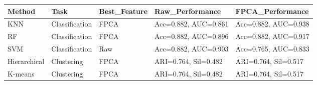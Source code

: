 
\begin{tabular}{lllll}
\toprule
Method & Task & Best\_Feature & Raw\_Performance & FPCA\_Performance\\
\midrule
KNN & Classification & FPCA & Acc=0.882, AUC=0.861 & Acc=0.882, AUC=0.938\\
RF & Classification & FPCA & Acc=0.882, AUC=0.896 & Acc=0.882, AUC=0.917\\
SVM & Classification & Raw & Acc=0.882, AUC=0.903 & Acc=0.765, AUC=0.833\\
Hierarchical & Clustering & FPCA & ARI=0.764, Sil=0.482 & ARI=0.764, Sil=0.517\\
K-means & Clustering & FPCA & ARI=0.764, Sil=0.482 & ARI=0.764, Sil=0.517\\
\bottomrule
\end{tabular}
